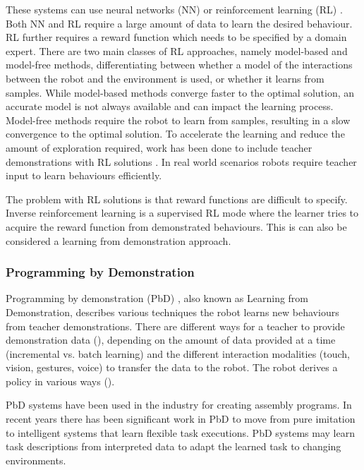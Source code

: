 These systems can use neural networks (NN) \cite{billard2001robust} or reinforcement learning (RL) \cite{smart2002effective}. Both NN and RL require a large amount of data to learn the desired behaviour. 
RL further requires a reward function which needs to be specified by a domain expert.
There are two main classes of RL approaches, namely model-based \cite{polydoros2017survey} and model-free \cite{kober2013reinforcement} methods, differentiating between whether a model of the interactions between the robot and the environment is used, or whether it learns from samples.
While model-based methods converge faster to the optimal solution, an accurate model is not always available and can impact the learning process.
Model-free methods require the robot to learn from samples, resulting in a slow convergence to the optimal solution.
To accelerate the learning and reduce the amount of exploration required, work has been done to include teacher demonstrations with RL solutions \cite{martinez2017relational,hester2017learning}.
In real world scenarios robots require teacher input to learn behaviours efficiently. 

The problem with RL solutions is that reward functions are difficult to specify.
Inverse reinforcement learning \cite{abbeel2011inverse} is a supervised RL mode where the learner tries to acquire the reward function from demonstrated behaviours.
This is can also be considered a learning from demonstration approach.

\subsubsection{Programming by Demonstration}
Programming by demonstration (PbD) \cite{billard2008robot}, also known as Learning from Demonstration, describes various techniques the robot learns new behaviours from teacher demonstrations. 
There are different ways for a teacher to provide demonstration data (), depending on the amount of data provided at a time (incremental vs. batch learning) and the different interaction modalities (touch, vision, gestures, voice) to transfer the data to the robot. 
The robot derives a policy in various ways (). 

PbD systems have been used in the industry for creating assembly programs. 
In recent years there has been significant work in PbD to move from pure imitation to intelligent systems that learn flexible task executions. 
PbD systems may learn task descriptions from interpreted data to adapt the learned task to changing environments.

